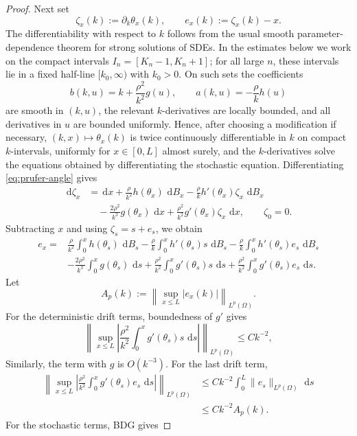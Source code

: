 \documentclass[11pt]{article}
\newcommand{\dd}{\,\mathrm d}
\begin{document}
\begin{proof}
Next set
\[
    \zeta_x(k):=\partial_k\theta_x(k),\qquad e_x(k):=\zeta_x(k)-x .
\]
The differentiability with respect to $k$ follows from the usual smooth parameter-dependence theorem for strong solutions of SDEs. In the estimates below we work on the compact intervals $I_n=[K_n-1,K_n+1]$; for all large $n$, these intervals lie in a fixed half-line $[k_0,\infty)$ with $k_0>0$. On such sets the coefficients
\[
    b(k,u)=k+\frac{\rho^2}{k^2}g(u),
    \qquad
    a(k,u)=-\frac{\rho}{k}h(u)
\]
are smooth in $(k,u)$, the relevant $k$-derivatives are locally bounded, and all derivatives in $u$ are bounded uniformly. Hence, after choosing a modification if necessary, $(k,x)\mapsto\theta_x(k)$ is twice continuously differentiable in $k$ on compact $k$-intervals, uniformly for $x\in[0,L]$ almost surely, and the $k$-derivatives solve the equations obtained by differentiating the stochastic equation. Differentiating \eqref{eq:prufer-angle} gives
\[
\begin{aligned}
    \dd\zeta_x
    &=\dd x+\frac{\rho}{k^2}h(\theta_x)\,\dd B_x
      -\frac{\rho}{k}h'(\theta_x)\zeta_x\,\dd B_x \\
    &\quad -\frac{2\rho^2}{k^3}g(\theta_x)\,\dd x
      +\frac{\rho^2}{k^2}g'(\theta_x)\zeta_x\,\dd x,
    \qquad \zeta_0=0.
\end{aligned}
\]
Subtracting $x$ and using $\zeta_s=s+e_s$, we obtain
\[
\begin{aligned}
    e_x
    ={}&\frac{\rho}{k^2}\int_0^x h(\theta_s)\,\dd B_s
      -\frac{\rho}{k}\int_0^x h'(\theta_s)s\,\dd B_s
      -\frac{\rho}{k}\int_0^x h'(\theta_s)e_s\,\dd B_s \\
    &-\frac{2\rho^2}{k^3}\int_0^x g(\theta_s)\,\dd s
      +\frac{\rho^2}{k^2}\int_0^x g'(\theta_s)s\,\dd s
      +\frac{\rho^2}{k^2}\int_0^x g'(\theta_s)e_s\,\dd s .
\end{aligned}
\]
Let
\[
    A_p(k):=\left\|\sup_{x\le L}|e_x(k)|\right\|_{L^p(\Omega)} .
\]
For the deterministic drift terms, boundedness of $g'$ gives
\[
    \left\|\sup_{x\le L}\left|\frac{\rho^2}{k^2}\int_0^x g'(\theta_s)s\,\dd s\right|\right\|_{L^p(\Omega)}
    \le Ck^{-2},
\]
Similarly, the term with $g$ is $O(k^{-3})$. For the last drift term,
\[
\begin{aligned}
    \left\|\sup_{x\le L}\left|\frac{\rho^2}{k^2}\int_0^x g'(\theta_s)e_s\,\dd s\right|\right\|_{L^p(\Omega)}
    &\le Ck^{-2}\int_0^L \|e_s\|_{L^p(\Omega)}\,\dd s  \\
    &\le Ck^{-2}A_p(k).
\end{aligned}
\]
For the stochastic terms, BDG gives

\end{proof}
\end{document}
